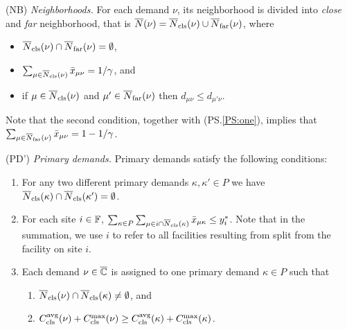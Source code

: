 \begin{description}
	
      \renewcommand{\theenumii}{(\alph{enumii})}
      \renewcommand{\labelenumii}{\theenumii}

\item{(NB)} \label{NB}
	\emph{Neighborhoods.}
	For each demand $\nu$, its neighborhood is divided into \emph{close} and
	\emph{far} neighborhood, that is ${\overline{N}}(\nu) = {\overline{N}}_{\text{cls}}(\nu) \cup {\overline{N}}_{\text{far}}(\nu)$, where
	\begin{itemize}
	\item ${\overline{N}}_{\text{cls}}(\nu) \cap {\overline{N}}_{\text{far}}(\nu) = \emptyset$,
	\item $\sum_{\mu\in{\overline{N}}_{\text{cls}}(\nu)} {\bar x}_{\mu\nu} =1/\gamma$, and 
	\item if $\mu\in {\overline{N}}_{\text{cls}}(\nu)$ and $\mu'\in {\overline{N}}_{\text{far}}(\nu)$ 
				then $d_{\mu\nu}\le d_{\mu'\nu}$.   
	\end{itemize}
	Note that the second condition, together with (PS.\ref{PS:one}), implies
	that $\sum_{\mu\in{\overline{N}}_{\text{far}}(\nu)} {\bar x}_{\mu\nu} =1-1/\gamma$.

\item{(PD')} \emph{Primary demands.}
	Primary demands satisfy the following conditions:

	\begin{enumerate}
		
	\item\label{PD1:disjoint}  For any two different primary demands $\kappa,\kappa'\in P$ we have
				${\overline{N}}_{\text{cls}}(\kappa)\cap {\overline{N}}_{\text{cls}}(\kappa') = \emptyset$.

	\item \label{PD1:yi} For each site $i\in\mathbb{F}$, 
		$ \sum_{\kappa\in P}\sum_{\mu\in
                  i\cap{\overline{N}}_{\text{cls}}(\kappa)}{\bar x}_{\mu\kappa} \leq
                y_i^\ast$. Note that in the summation, we use $i$ to
                refer to all facilities resulting from split from the
                facility on site $i$.
		
	\item \label{PD1:assign} Each demand $\nu\in\overline{\mathbb{C}}$ is assigned
        to one primary demand $\kappa\in P$ such that

  			\begin{enumerate}
	
				\item \label{PD1:assign:overlap} ${\overline{N}}_{\text{cls}}(\nu) \cap {\overline{N}}_{\text{cls}}(\kappa) \neq \emptyset$, and
				\item \label{PD1:assign:cost}
          $C_{\text{cls}}^{{\mbox{\scriptsize\rm avg}}}(\nu)+C_{\text{cls}}^{\max}(\nu) \geq
          C_{\text{cls}}^{{\mbox{\scriptsize\rm avg}}}(\kappa)+C_{\text{cls}}^{\max}(\kappa)$.
			\end{enumerate}


\end{enumerate}
\end{description}
